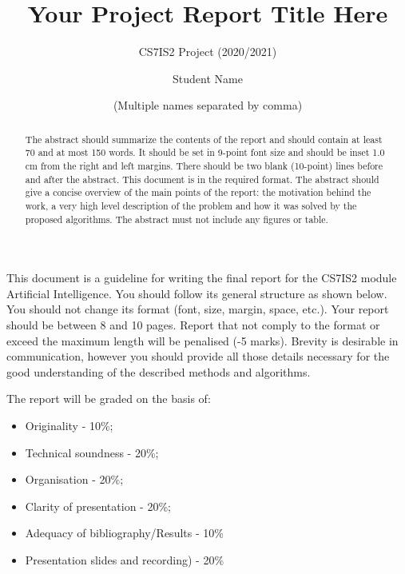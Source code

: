 \documentclass{svproc}
\begin{document}
\mainmatter
\title{Your Project Report Title Here
}
\subtitle{CS7IS2 Project (2020/2021)}
\author{Student Name \and (Multiple names separated by comma)}


\maketitle              %

\begin{abstract}
The abstract should summarize the contents of the report and should contain at least 70 and at most 150 words. It should be set in 9-point font size and should be inset 1.0 cm from the right and left margins. There should be two blank (10-point) lines before and after the abstract. This document is in the required format. The abstract should give a concise overview of the main points of the report: the motivation behind the work, a very high level description of the problem and how it was solved by the proposed algorithms. The abstract must not include any figures or table.
\end{abstract}
%

This document is a guideline for writing the final report for the CS7IS2 module Artificial Intelligence. You should follow its general structure as shown below.
You should not change its format (font, size, margin, space, etc.). 
Your report should be between 8 and 10 pages. Report that not comply to the format or exceed the maximum length will be penalised (-5 marks).
Brevity is desirable in communication, however you should provide all those details necessary for the good understanding of the described methods and algorithms. 

The report will be graded on the basis of:

\begin{itemize}
\item Originality - 10\%;
\item Technical soundness - 20\%;
\item Organisation - 20\%;
\item Clarity of presentation - 20\%;
\item Adequacy of bibliography/Results - 10\%
\item Presentation slides and recording) - 20\%
\end{itemize}
\end{document}
